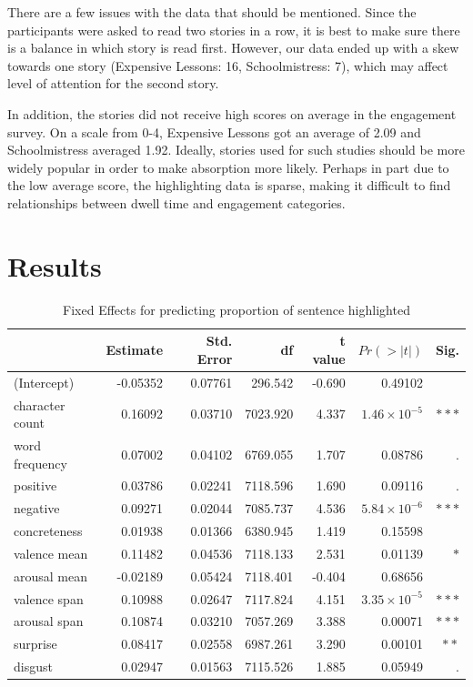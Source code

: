 \documentclass[11pt]{article}
\begin{document}
There are a few issues with the data that should be mentioned. Since the participants were asked to read two stories in a row, it is best to make sure there is a balance in which story is read first. However, our data ended up with a skew towards one story (Expensive Lessons: 16, Schoolmistress: 7), which may affect level of attention for the second story. 

In addition, the stories did not receive high scores on average in the engagement survey. On a scale from 0-4, Expensive Lessons got an average of 2.09 and Schoolmistress averaged 1.92. Ideally, stories used for such studies should be more widely popular in order to make absorption more likely. Perhaps in part due to the low average score, the highlighting data is sparse, making it difficult to find relationships between dwell time and engagement categories.

\section{Results}

\begin{table}[h]
\centering
\begin{tabular}{|l|r|r|r|r|r|r|}
\hline
& Estimate & Std. Error & df & t value & $Pr(>|t|)$ & Sig. \\
\hline
(Intercept) & -0.05352 & 0.07761 & 296.542 & -0.690 & 0.49102 & \\
character count & 0.16092 & 0.03710 & 7023.920 & 4.337 & $1.46 \times 10^{-5}$ & $\ast\ast\ast$ \\
word frequency & 0.07002 & 0.04102 & 6769.055 & 1.707 & 0.08786 & . \\
positive & 0.03786 & 0.02241 & 7118.596 & 1.690 & 0.09116 & . \\
negative & 0.09271 & 0.02044 & 7085.737 & 4.536 & $5.84 \times 10^{-6}$ & $\ast\ast\ast$ \\
concreteness & 0.01938 & 0.01366 & 6380.945 & 1.419 & 0.15598 & \\
valence mean & 0.11482 & 0.04536 & 7118.133 & 2.531 & 0.01139 & $\ast$ \\
arousal mean & -0.02189 & 0.05424 & 7118.401 & -0.404 & 0.68656 & \\
valence span & 0.10988 & 0.02647 & 7117.824 & 4.151 & $3.35 \times 10^{-5}$ & $\ast\ast\ast$ \\
arousal span & 0.10874 & 0.03210 & 7057.269 & 3.388 & 0.00071 & $\ast\ast\ast$ \\
surprise & 0.08417 & 0.02558 & 6987.261 & 3.290 & 0.00101 & $\ast\ast$ \\
disgust & 0.02947 & 0.01563 & 7115.526 & 1.885 & 0.05949 & . \\
\hline
\end{tabular}
\caption{Fixed Effects for predicting proportion of sentence highlighted}
\label{tab:second}
\end{table}
\end{document}
